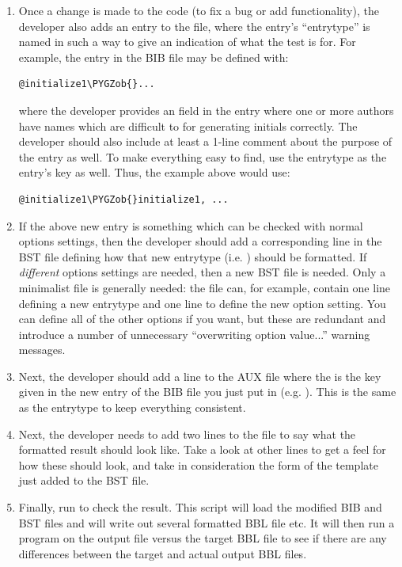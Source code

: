 \documentclass[letterpaper,10pt,english]{sphinxmanual}
\def\PYGZob{\char`\{}
\begin{document}
\begin{enumerate}
\item {} 
Once a change is made to the code (to fix a bug or add functionality), the developer also adds an entry to the  file, where the entry's ``entrytype'' is named in such a way to give an indication of what the test is for. For example, the entry in the BIB file may be defined with:

\begin{Verbatim}[commandchars=\\\{\}]
@initialize1\PYGZob{}...
\end{Verbatim}

where the developer provides an  field in the entry where one or more authors have names which are difficult to for generating initials correctly. The developer should also include at least a 1-line comment about the purpose of the entry as well. To make everything easy to find, use the entrytype as the entry's key as well. Thus, the example above would use:

\begin{Verbatim}[commandchars=\\\{\}]
@initialize1\PYGZob{}initialize1, ...
\end{Verbatim}

\item {} 
If the above new entry is something which can be checked with normal options settings, then the developer should add a corresponding line in the BST file defining how that new entrytype (i.e. ) should be formatted. If \emph{different} options settings are needed, then a new BST file is needed. Only a minimalist file is generally needed: the file can, for example, contain one line defining a new entrytype and one line to define the new option setting. You can define all of the other options if you want, but these are redundant and introduce a number of unnecessary ``overwriting option value...'' warning messages.

\item {} 
Next, the developer should add a line  to the AUX file where the  is the key given in the new entry of the BIB file you just put in (e.g. ). This is the same as the entrytype to keep everything consistent.

\item {} 
Next, the developer needs to add two lines to the  file to say what the formatted result should look like. Take a look at other lines to get a feel for how these should look, and take in consideration the form of the template just added to the BST file.

\item {} 
Finally, run  to check the result. This script will load the modified BIB and BST files and will write out several formatted BBL file  etc. It will then run a  program on the output file versus the target BBL file to see if there are any differences between the target and actual output BBL files.

\end{enumerate}
\end{document}
